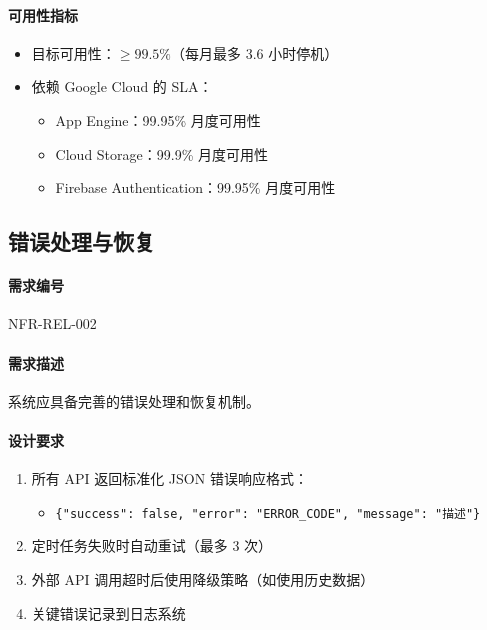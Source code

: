 \paragraph{可用性指标}
\begin{itemize}
    \item 目标可用性：$\geq 99.5\%$（每月最多 3.6 小时停机）
    \item 依赖 Google Cloud 的 SLA：
          \begin{itemize}
              \item App Engine：99.95\% 月度可用性
              \item Cloud Storage：99.9\% 月度可用性
              \item Firebase Authentication：99.95\% 月度可用性
          \end{itemize}
\end{itemize}

\subsection{错误处理与恢复}

\paragraph{需求编号} NFR-REL-002

\paragraph{需求描述} 系统应具备完善的错误处理和恢复机制。

\paragraph{设计要求}
\begin{enumerate}
    \item 所有 API 返回标准化 JSON 错误响应格式：
          \begin{itemize}
              \item \texttt{\{"success": false, "error": "ERROR\_CODE", "message": "描述"\}}
          \end{itemize}
    \item 定时任务失败时自动重试（最多 3 次）
    \item 外部 API 调用超时后使用降级策略（如使用历史数据）
    \item 关键错误记录到日志系统
\end{enumerate}

